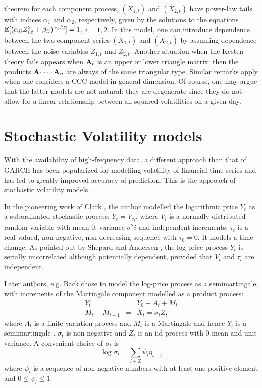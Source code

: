 theorem for each component process, $(X_{1,t})$ and $(X_{2,t})$ have
power-law tails  with indices $\alpha_1$ and $\alpha_2$, respectively,
given by the solutions to the equations  $\mathbb{E} [(\alpha_{ii}
Z_{i,t}^2+\beta_{ii})^{\alpha_i/2}]=1$, $i=1,2$. In this model, one
can introduce dependence between the two component series $(X_{1,t})$
and $(X_{2,t})$ by assuming dependence between the noise variables
$Z_{1,t}$ and $Z_{2,t}$. Another situation when the Kesten theory fails 
appears when ${\mathbf A}_t$ is an upper or lower triangle matrix: then the
products  ${\mathbf A}_1\cdots{\mathbf A}_n$ are always of the same triangular
type. 
Similar remarks apply when one considers a CCC model in general
dimension. Of course, one may argue that the latter models 
are not natural: they are degenerate since they do not allow 
for a linear relationship between all squared volatilities on a given
day.

\section{Stochastic Volatility models}
With the availability of high-frequency data, a different approach
than that of GARCH has been popularized for modelling volatility of
financial time series and has led to greatly improved accuracy of
prediction. This is the approach of stochastic volatility models.

In the pioneering work of Clark \cite{clark:1973}, the author modelled
the logarithmic price $Y_t$ as a subordinated stochastic process:
$Y_t = V_{\tau_t}$, where $V_i$ is a normally distributed random
variable with mean 0, variance $\sigma^2 i$ and independent
increments. $\tau_t$ is a real-valued, non-negative, non-decreasing
sequence with $\tau_0 = 0$. It models a time change. As pointed out by
Shepard and Andersen \cite{Shephard:Andersen:2009}, the log-price
process $Y_t$ is serially uncorrelated although potentially dependent,
provided that $V_t$ and $\tau_t$ are independent.

Later authors, e.g. Back \cite{back:1991} chose to model the log-price
process as a semimartingale, with increments of the Martingale
component modelled as a product process:
\begin{eqnarray*}
  Y_t &=& Y_0 + A_t + M_t \\
  M_t - M_{t-1} &=& X_t = \sigma_t Z_t
\end{eqnarray*}
where $A_t$ is a finite variation process and $M_t$ is a Martingale
and hence $Y_t$ is a semimartingale . $\sigma_t$ is non-negative and
$Z_t$ is an iid process with 0 mean and unit variance. A convenient
choice of $\sigma_t$ is
\[
\log\sigma_t = \sum_{l \in \mathbb Z} \psi_l \eta_{t-l}
\]
where $\psi_l$ is a sequence of non-negative numbers with at least one
positive element and $0 \leq \psi_l \leq 1$.

